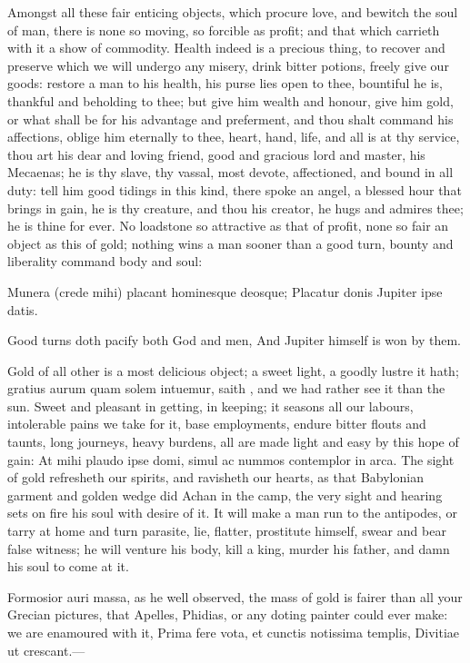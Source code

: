 {Amongst all these fair enticing objects, which procure love, and
bewitch the soul of man, there is none so moving, so forcible as
profit; and that which carrieth with it a show of commodity. Health
indeed is a precious thing, to recover and preserve which we will
undergo any misery, drink bitter potions, freely give our goods:
restore a man to his health, his purse lies open to thee, bountiful he
is, thankful and beholding to thee; but give him wealth and honour,
give him gold, or what shall be for his advantage and preferment, and
thou shalt command his affections, oblige him eternally to thee, heart,
hand, life, and all is at thy service, thou art his dear and loving
friend, good and gracious lord and master, his Mecaenas; he is thy
slave, thy vassal, most devote, affectioned, and bound in all duty:
tell him good tidings in this kind, there spoke an angel, a blessed
hour that brings in gain, he is thy creature, and thou his creator, he
hugs and admires thee; he is thine for ever. No loadstone so attractive
as that of profit, none so fair an object as this of gold;
nothing wins a man sooner than a good turn, bounty and liberality
command body and soul:

Munera (crede mihi) placant hominesque deosque;
Placatur donis Jupiter ipse datis.

Good turns doth pacify both God and men,
And Jupiter himself is won by them.

Gold of all other is a most delicious object; a sweet light, a goodly
lustre it hath; gratius aurum quam solem intuemur, saith \Austin{}, and we
had rather see it than the sun. Sweet and pleasant in getting, in
keeping; it seasons all our labours, intolerable pains we take for it,
base employments, endure bitter flouts and taunts, long journeys, heavy
burdens, all are made light and easy by this hope of gain: At mihi
plaudo ipse domi, simul ac nummos contemplor in arca. The sight of gold
refresheth our spirits, and ravisheth our hearts, as that Babylonian
garment and  golden wedge did Achan in the camp, the very sight
and hearing sets on fire his soul with desire of it. It will make a man
run to the antipodes, or tarry at home and turn parasite, lie, flatter,
prostitute himself, swear and bear false witness; he will venture his
body, kill a king, murder his father, and damn his soul to come at it.

Formosior auri massa, as  he well observed, the mass of gold is
fairer than all your Grecian pictures, that Apelles, Phidias, or any
doting painter could ever make: we are enamoured with it,
Prima fere vota, et cunctis notissima templis,
Divitiae ut crescant.---

}
